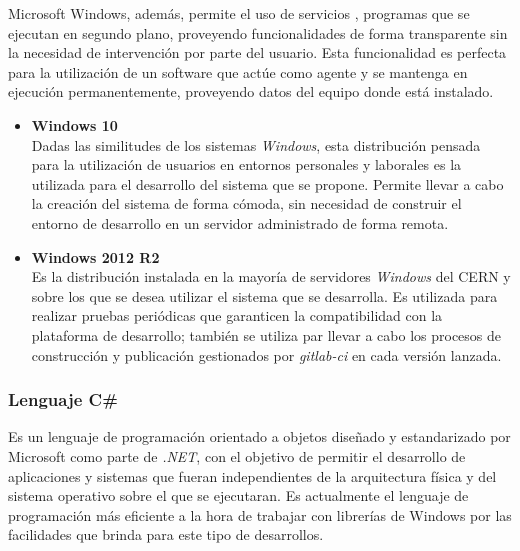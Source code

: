             Microsoft Windows, además, permite el uso de servicios \cite{wikiservicios}, programas que se ejecutan en segundo plano, proveyendo funcionalidades de forma transparente sin la necesidad de intervención por parte del usuario. Esta funcionalidad es perfecta para la utilización de un software que actúe como agente y se mantenga en ejecución permanentemente, proveyendo datos del equipo donde está instalado.
            
            \begin{itemize}
                \item \textbf{Windows 10} \\
                Dadas las similitudes de los sistemas \textit{Windows}, esta distribución pensada para la utilización de usuarios en entornos personales y laborales es la utilizada para el desarrollo del sistema que se propone. Permite llevar a cabo la creación del sistema de forma cómoda, sin necesidad de construir el entorno de desarrollo en un servidor administrado de forma remota.
                
                \item \textbf{Windows 2012 R2} \\
                Es la distribución instalada en la mayoría de servidores \textit{Windows} del CERN y sobre los que se desea utilizar el sistema que se desarrolla. Es utilizada para realizar pruebas periódicas que garanticen la compatibilidad con la plataforma de desarrollo; también se utiliza par llevar a cabo los procesos de construcción y publicación gestionados por \textit{gitlab-ci} en cada versión lanzada.
                
            \end{itemize}

        \subsubsection{Lenguaje C\#}
            Es un lenguaje de programación orientado a objetos diseñado y estandarizado por Microsoft como parte de \textit{.NET}, con el objetivo de permitir el desarrollo de aplicaciones y sistemas que fueran independientes de la arquitectura física y del sistema operativo sobre el que se ejecutaran. Es actualmente el lenguaje de programación más eficiente a la hora de trabajar con librerías de Windows por las facilidades que brinda para este tipo de desarrollos. \cite{csharp}

